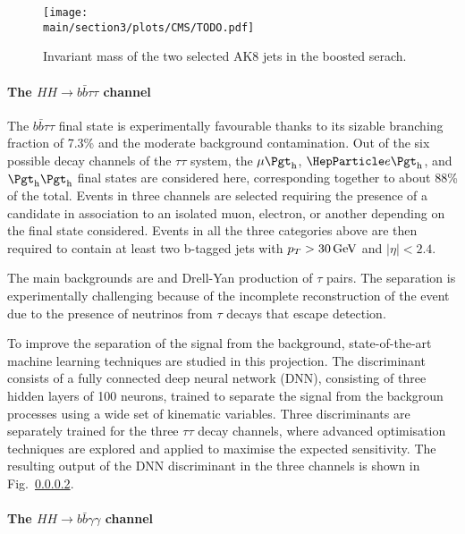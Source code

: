 \begin{figure}[!htb]
\centering 
\texttt{[image: \\main/section3/plots/CMS/TODO.pdf]}
\caption{Invariant mass of the two selected AK8 jets in the boosted \bbbb \HH serach. } 
\label{sec3:CMSHH:fig:bbbb_boosted} 
\end{figure}



\paragraph{The $HH \rightarrow b\bar{b}\tau\tau$ channel}

The $b\bar{b}\tau\tau$ final state is experimentally favourable thanks to its sizable branching fraction of 7.3\% and the moderate background contamination.
Out of the six possible decay channels of the $\tau\tau$ system, the $\mu\tauh$, $\Pe\tauh$, and $\tauh\tauh$ final states are considered here, corresponding together to about 88\% of the total.
Events in three channels are selected requiring the presence of a \tauh candidate in association to an isolated muon, electron, or another \tauh depending on the final state considered.
Events in all the three categories above are then required to contain at least two b-tagged jets with $p_{T} > 30\,\text{Ge\hspace{-.08em}V}$ and $|\eta| < 2.4$. 

The main backgrounds are \ttbar and Drell-Yan production of $\tau$ pairs.
The separation is experimentally challenging because of the incomplete reconstruction of the event due to the presence of neutrinos from $\tau$ decays that escape detection.

To improve the separation of the signal from the background, state-of-the-art machine learning techniques are studied in this projection.
The discriminant consists of a fully connected deep neural network (DNN), consisting of three hidden layers of 100 neurons, trained to separate the \HH signal from the backgroun processes using a wide set of kinematic variables.
Three discriminants are separately trained for the three $\tau\tau$ decay channels, where advanced optimisation techniques are explored and applied to maximise the expected sensitivity.
The resulting output of the DNN discriminant in the three channels is shown in Fig.~\ref{}. 

\paragraph{The $HH \rightarrow b\bar{b}\gamma\gamma$ channel}

